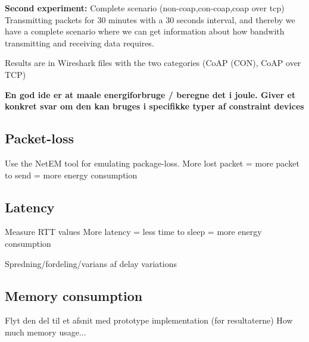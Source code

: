 \textbf{Second experiment:} Complete scenario (non-coap,con-coap,coap over tcp)
Transmitting packets for 30 minutes with a 30 seconds interval, and thereby we have a complete scenario where we can get information about how bandwith transmitting and receiving data requires.

Results are in Wireshark files with the two categories (CoAP (CON), CoAP over TCP)

\textbf{En god ide er at maale energiforbruge / beregne det i joule. Giver et konkret svar om den kan bruges i specifikke typer af constraint devices}


\subsection{Packet-loss}
Use the NetEM tool for emulating package-loss.
More lost packet = more packet to send = more energy consumption

\subsection{Latency}
Measure RTT values %
More latency = less time to sleep = more energy consumption

Spredning/fordeling/varians af delay variations 


\subsection{Memory consumption}
Flyt den del til et afsnit med prototype implementation (før resultaterne)
How much memory usage...


